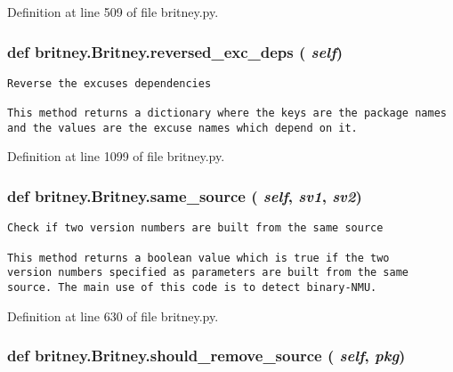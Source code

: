 Definition at line 509 of file britney.py.
\subsubsection{\setlength{\rightskip}{0pt plus 5cm}def britney.Britney.reversed\_\-exc\_\-deps ( {\em self})}\label{classbritney_1_1Britney_be1b4af9d6c6650c70b24267412bc1a8}




\footnotesize\begin{verbatim}Reverse the excuses dependencies

This method returns a dictionary where the keys are the package names
and the values are the excuse names which depend on it.
\end{verbatim}
\normalsize
 

Definition at line 1099 of file britney.py.
\subsubsection{\setlength{\rightskip}{0pt plus 5cm}def britney.Britney.same\_\-source ( {\em self},  {\em sv1},  {\em sv2})}\label{classbritney_1_1Britney_85d2e45e8431779b62f398c34972ddf1}




\footnotesize\begin{verbatim}Check if two version numbers are built from the same source

This method returns a boolean value which is true if the two
version numbers specified as parameters are built from the same
source. The main use of this code is to detect binary-NMU.
\end{verbatim}
\normalsize
 

Definition at line 630 of file britney.py.
\subsubsection{\setlength{\rightskip}{0pt plus 5cm}def britney.Britney.should\_\-remove\_\-source ( {\em self},  {\em pkg})}\label{classbritney_1_1Britney_f8a6c9adbdec7a5a982dd2b74febcc08}




